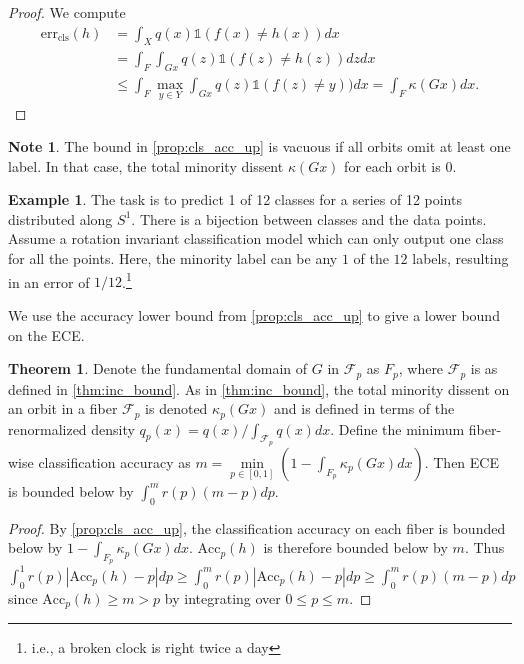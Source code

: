 \documentclass[10pt]{article} %
\theoremstyle{definition}
\newtheorem{example}{Example}
\newtheorem{nt}{Note}
\newtheorem{thm}{Theorem}
\newcommand{\Acc}{\mathrm{Acc}_p(h)}
\begin{document}
\begin{proof} We compute
\begin{align*}
 \text{err}_{\text{cls}}(h)  &= \int_Xq(x)\mathds{1}(f(x) \neq h(x))dx\\
 &= \int_F \int_{Gx}q(z)\mathds{1}(f(z) \neq h(z))dzdx\\
 &\leq \int_F \underset{y \in Y}{\max}\int_{Gx}q(z) \mathds{1} (f(z) \neq y))dx = \int_F \kappa (Gx)dx.
\end{align*}
\end{proof}

\begin{nt} \label{nt:note}
The bound in \cref{prop:cls_acc_up} is vacuous if all orbits omit at least one label.  In that case, the total minority dissent $\kappa(Gx)$ for each orbit is 0.
\end{nt} 

\begin{example}
The task is to predict 1 of 12 classes for a series of 12 points distributed along $S^1$. There is a bijection between classes and the data points. Assume a rotation invariant classification model which can only output one class for all the points. Here, the minority label can be any $1$ of the $12$ labels, resulting in an error of $1/12$.\footnote{i.e., a broken clock is right twice a day}
\end{example}

We use the accuracy lower bound from \cref{prop:cls_acc_up} to give a lower bound on the ECE.

\begin{thm}
\label{thm:ece_lb}
Denote the fundamental domain of $G$ in $\mathcal{F}_p$ as $F_p$, where $\mathcal{F}_p$ is as defined in \cref{thm:inc_bound}. As in  \cref{thm:inc_bound}, the total minority dissent on an orbit in a fiber $\mathcal{F}_p$ is denoted $\kappa_p(Gx)$ and is defined in terms of the renormalized density $q_p(x) = q(x)/\int_{\mathcal{F}_p}q(x)dx$. Define the minimum fiber-wise classification accuracy as $m = \underset{p \in [0,1]}{\min} \left(1 - \int_{F_p} \kappa_p(Gx)dx \right)$. Then ECE is bounded below by $\int_0^m r(p) ( m - p)dp$.
\end{thm}

\begin{proof}
By \cref{prop:cls_acc_up}, the classification accuracy on each fiber is bounded below by $1 - \int_{F_p} \kappa_p(Gx)dx$. $\Acc$ is therefore bounded below by $m$.  Thus $\int_0^1 r(p) | \Acc - p|dp \geq \int_0^m r(p) | \Acc - p|dp \geq \int_0^m r(p) ( m - p)dp$ since $\Acc \geq m > p$ by integrating over $0 \leq p \leq m$.
\end{proof}
\end{document}

